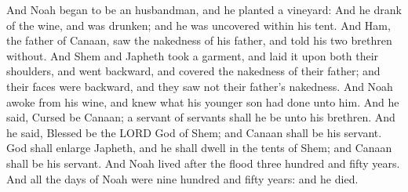 \begin{biblechapter}
\verse And Noah began to be an husbandman, and he planted a vineyard:
\verse And he drank of the wine, and was drunken; and he was uncovered within his tent.
\verse And Ham, the father of Canaan, saw the nakedness of his father, and told his two brethren without.
\verse And Shem and Japheth took a garment, and laid it upon both their shoulders, and went backward, and covered the nakedness of their father; and their faces were backward, and they saw not their father's nakedness.
\verse And Noah awoke from his wine, and knew what his younger son had done unto him.
\verse And he said, Cursed be Canaan; a servant of servants shall he be unto his brethren.
\verse And he said, Blessed be the LORD God of Shem; and Canaan shall be his servant.
\verse God shall enlarge Japheth, and he shall dwell in the tents of Shem; and Canaan shall be his servant.
\verse And Noah lived after the flood three hundred and fifty years.
\verse And all the days of Noah were nine hundred and fifty years: and he died.
\end{biblechapter}

